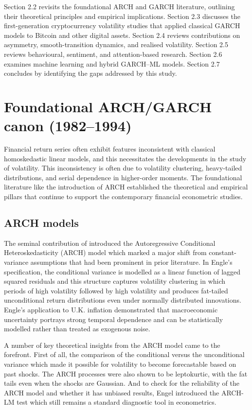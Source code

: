\documentclass[12pt]{report}
\begin{document}
Section 2.2 revisits the foundational ARCH and GARCH literature, outlining their theoretical principles and empirical implications. Section 2.3 discusses the first-generation cryptocurrency volatility studies that applied classical GARCH models to Bitcoin and other digital assets. Section 2.4 reviews contributions on asymmetry, smooth-transition dynamics, and realised volatility. Section 2.5 reviews behavioural, sentiment, and attention-based research. Section 2.6 examines machine learning and hybrid GARCH–ML models. Section 2.7 concludes by identifying the gaps addressed by this study.

\section{Foundational ARCH/GARCH canon (1982–1994)}
Financial return series often exhibit features inconsistent with classical homoskedastic linear models, and this necessitates the developments in the study of volatility. This inconsistency is often due to volatility clustering, heavy-tailed distributions, and serial dependence in higher-order moments. The foundational literature like the introduction of ARCH established the theoretical and empirical pillars that continue to support the contemporary financial econometric studies.

\subsection{ARCH models}

The seminal contribution of \cite{engle1982arch} introduced the Autoregressive Conditional Heteroskedasticity (ARCH) model which marked a major shift from constant-variance assumptions that had been prominent in prior literature. In Engle's specification, the conditional variance is modelled as a linear function of lagged squared residuals and this structure captures volatility clustering in which periods of high volatility followed by high volatility and produces fat-tailed unconditional return distributions even under normally distributed innovations. Engle's application to U.K. inflation demonstrated that macroeconomic uncertainty portrays strong temporal dependence and can be statistically modelled rather than treated as exogenous noise.

A number of key theoretical insights from the ARCH model came to the forefront. First of all, the comparison of the conditional versus the unconditional variance which made it possible for volatility to become forecastable based on past shocks. The ARCH processes were also shown to be leptokurtic, with the fat tails even when the shocks are Gaussian. And to check for the reliability of the ARCH model and whether it has unbiased results, Engel introduced the ARCH-LM test which still remains a standard diagnostic tool in econometrics.
\end{document}
